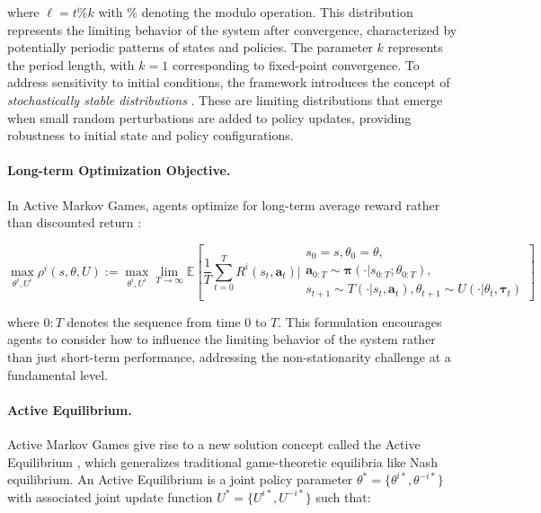 \documentclass[a4paper,12pt]{report}
\begin{document}
where $\ell = t\%k$ with $\%$ denoting the modulo operation. This distribution represents the limiting behavior of the system after convergence, characterized by potentially periodic patterns of states and policies. The parameter $k$ represents the period length, with $k=1$ corresponding to fixed-point convergence. To address sensitivity to initial conditions, the framework introduces the concept of \textit{stochastically stable distributions} \cite{kim2022influencing}. These are limiting distributions that emerge when small random perturbations are added to policy updates, providing robustness to initial state and policy configurations.

\paragraph{Long-term Optimization Objective.} In Active Markov Games, agents optimize for long-term average reward rather than discounted return \cite{sutton2018reinforcement, kim2022influencing}:

\begin{equation}
    \max_{\theta^i, U^i} \rho^i(s, \theta, U) := \max_{\theta^i, U^i} \lim_{T \to \infty} \mathbb{E}\left[\frac{1}{T}\sum_{t=0}^T R^i(s_t, \mathbf{a}_t) \Bigg|
        \begin{array}{c}
            s_0=s, \theta_0=\theta,                                              \\
            \mathbf{a}_{0:T} \sim \boldsymbol{\pi}(\cdot|s_{0:T}; \theta_{0:T}), \\
            s_{t+1} \sim T(\cdot|s_t, \mathbf{a}_t),
            \theta_{t+1} \sim U(\cdot|\theta_t, \boldsymbol{\tau}_t)
        \end{array}
        \right]
\end{equation}

where  $0:T$ denotes the sequence from time $0$ to $T$. This formulation encourages agents to consider how to influence the limiting behavior of the system rather than just short-term performance, addressing the non-stationarity challenge at a fundamental level.

\paragraph{Active Equilibrium.} Active Markov Games give rise to a new solution concept called the Active Equilibrium \cite{kim2022influencing}, which generalizes traditional game-theoretic equilibria like Nash equilibrium. An Active Equilibrium is a joint policy parameter $\theta^* = \{\theta^{i*}, \theta^{-i*}\}$ with associated joint update function $U^* = \{U^{i*}, U^{-i*}\}$ such that:
\end{document}
